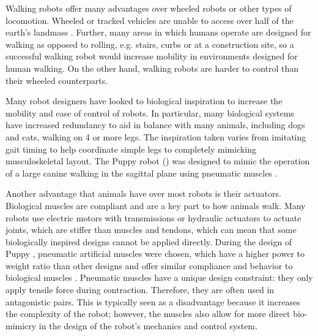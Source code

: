 Walking robots offer many advantages over wheeled robots or other types
of locomotion. Wheeled or tracked vehicles are unable to access over half
of the earth's landmass \cite{BigDog}. Further, many areas in which humans
operate are designed for walking as opposed to rolling, e.g. stairs, curbs or at a construction site, so a successful walking
robot would increase mobility in environments designed for human walking. On the
other hand, walking robots are harder to control than their wheeled
counterparts.

Many robot designers have looked to biological inspiration to increase the mobility and
ease of control of robots. In particular, many biological systems have increased
redundancy to aid in balance with many animals, including dogs and cats, walking
on 4 or more legs. The inspiration taken varies from imitating gait timing \cite{Raibert1986} to
help coordinate simple legs to completely mimicking musculoskeletal layout. The
Puppy robot () was designed to mimic the operation of a large 
canine walking in the sagittal plane using pneumatic muscles \cite{PuppyDesign}.

Another advantage that animals have over most robots is their actuators.
Biological muscles are compliant and are a key part to how animals walk. Many
robots use electric motors with transmissions or hydraulic actuators to actuate joints, which are stiffer than muscles and tendons, which can
mean that some biologically inspired designs cannot be applied directly. During the design of Puppy \cite{PuppyDesign}, pneumatic artificial muscles were chosen, which have a higher
power to weight ratio than other designs and offer similar compliance and
behavior to biological muscles \cite{Tavakoli2008}. Pneumatic muscles have a unique design constraint: they only apply tensile force during contraction. Therefore,
they are often used in antagonistic pairs. This is typically seen as a disadvantage because it increases the complexity of the robot; however, the muscles also allow for more direct bio-mimicry in the design of the robot's mechanics
and control system.

